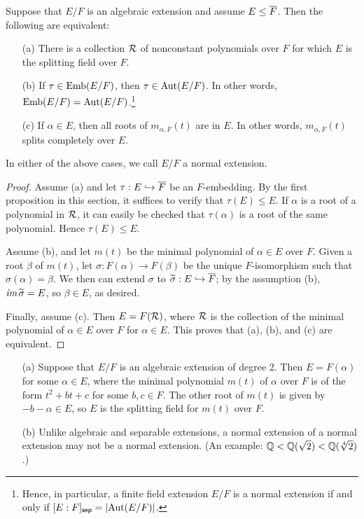 \begin{thm}\label{equiv_normal_extensions}
    Suppose that $E/F$ is an algebraic extension and assume $E\leq\overline{F}$.
    Then the following are equivalent:
    \begin{enumerate}
        \item[(a)]
        {
            There is a collection ${\mathcal{R}}$ of nonconstant polynomials over $F$ for which $E$ is the splitting field over $F$.
        }
        \item[(b)]
        {
            If $\tau\in{\textrm{Emb}({E/F})}$, then $\tau\in{\textrm{Aut}({E/F})}$.
            In other words, ${\textrm{Emb}({E/F})}={\textrm{Aut}({E/F})}$.\footnote{Hence, in particular, a finite field extension $E/F$ is a normal extension if and only if $[E:F]_{\textsf{sep}}=|{\textrm{Aut}({E/F})}|$.}
        }
        \item[(c)]
        {
            If $\alpha\in E$, then all roots of $m_{\alpha, F}(t)$ are in $E$.
            In other words, $m_{\alpha, F}(t)$ splits completely over $E$.
        }
    \end{enumerate}
    In either of the above cases, we call $E/F$ a normal extension.
\end{thm}
\begin{proof}
    Assume (a) and let $\tau: E\hookrightarrow\overline{F}$ be an $F$-embedding.
    By the first proposition in this section, it suffices to verify that $\tau(E)\leq E$.
    If $\alpha$ is a root of a polynomial in ${\mathcal{R}}$, it can easily be checked that $\tau(\alpha)$ is a root of the same polynomial.
    Hence $\tau(E)\leq E$.

    Assume (b), and let $m(t)$ be the minimal polynomial of $\alpha\in E$ over $F$.
    Given a root $\beta$ of $m(t)$, let $\sigma: F(\alpha)\rightarrow F(\beta)$ be the unique $F$-isomorphism such that $\sigma(\alpha)=\beta$.
    We then can extend $\sigma$ to $\widetilde{\sigma}: E\hookrightarrow\overline{F}$; by the assumption (b), $\textit{im\,}\widetilde{\sigma}=E$, so $\beta\in E$, as desired.

    Finally, assume (c).
    Then $E=F({\mathcal{R}})$, where ${\mathcal{R}}$ is the collection of the minimal polynomial of $\alpha\in E$ over $F$ for $\alpha\in E$.
    This proves that (a), (b), and (c) are equivalent.
\end{proof}

\begin{exmp}
    \begin{enumerate}
        \item[(a)]
        {
            Suppose that $E/F$ is an algebraic extension of degree 2.
            Then $E=F(\alpha)$ for some $\alpha\in E$, where the minimal polynomial $m(t)$ of $\alpha$ over $F$ is of the form $t^2+bt+c$ for some $b, c\in F$.
            The other root of $m(t)$ is given by $-b-\alpha\in E$, so $E$ is the splitting field for $m(t)$ over $F$.
        }
        \item[(b)]
        {
            Unlike algebraic and separable extensions, a normal extension of a normal extension may not be a normal extension.
            (An example: ${\mathbb{Q}}<{\mathbb{Q}}(\sqrt{2})<{\mathbb{Q}}(\sqrt[4]{2})$.)
        }
    \end{enumerate}
\end{exmp}


